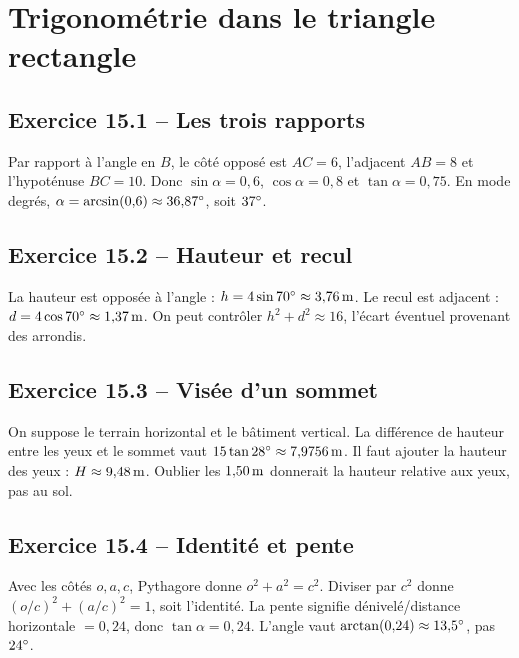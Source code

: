 \chapter{Trigonométrie dans le triangle rectangle}
\label{corriges:15}
\section*{Exercice 15.1 -- Les trois rapports}
Par rapport à l'angle en $B$, le côté opposé est $AC=6$, l'adjacent $AB=8$ et l'hypoténuse $BC=10$. Donc $\sin\alpha=0{,}6$, $\cos\alpha=0{,}8$ et $\tan\alpha=0{,}75$. En mode degrés, $\alpha=\arcsin(0{,}6)\approx36{,}87^{\circ}$, soit $37^{\circ}$.

\section*{Exercice 15.2 -- Hauteur et recul}
La hauteur est opposée à l'angle : $h=4\sin70^{\circ}\approx3{,}76\,\mathrm{m}$. Le recul est adjacent : $d=4\cos70^{\circ}\approx1{,}37\,\mathrm{m}$. On peut contrôler $h^2+d^2\approx16$, l'écart éventuel provenant des arrondis.

\section*{Exercice 15.3 -- Visée d'un sommet}
On suppose le terrain horizontal et le bâtiment vertical. La différence de hauteur entre les yeux et le sommet vaut $15\tan28^{\circ}\approx7{,}9756\,\mathrm{m}$. Il faut ajouter la hauteur des yeux : $H\approx9{,}48\,\mathrm{m}$. Oublier les $1{,}50\,\mathrm{m}$ donnerait la hauteur relative aux yeux, pas au sol.

\section*{Exercice 15.4 -- Identité et pente}
Avec les côtés $o,a,c$, Pythagore donne $o^2+a^2=c^2$. Diviser par $c^2$ donne $(o/c)^2+(a/c)^2=1$, soit l'identité.
La pente signifie dénivelé/distance horizontale $=0{,}24$, donc $\tan\alpha=0{,}24$. L'angle vaut $\arctan(0{,}24)\approx13{,}5^{\circ}$, pas $24^{\circ}$.
